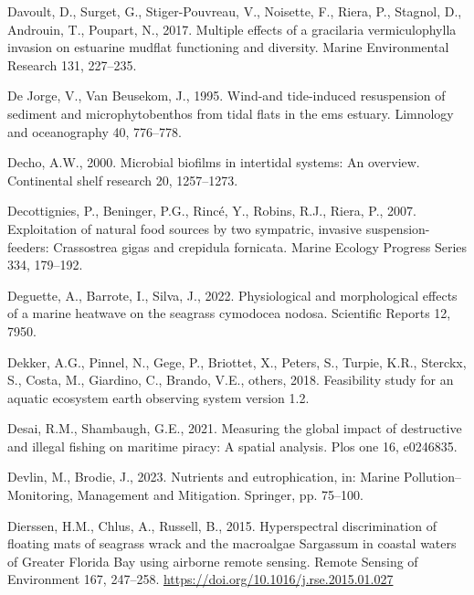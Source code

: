 \documentclass[
  letterpaper,
  11pt,
  english,
  singlespacing,
  headsepline]{MastersDoctoralThesis}
\newlength{\cslhangindent}
\newenvironment{CSLReferences}[2] %
 {\begin{list}{}{%
  \setlength{\itemindent}{0pt}
  \setlength{\leftmargin}{0pt}
  \setlength{\parsep}{0pt}
  \ifodd #1
   \setlength{\leftmargin}{\cslhangindent}
   \setlength{\itemindent}{-1\cslhangindent}
  \fi
  \setlength{\itemsep}{#2\baselineskip}}}
 {\end{list}}
\begin{document}
\begin{CSLReferences}{1}{0}
Davoult, D., Surget, G., Stiger-Pouvreau, V., Noisette, F., Riera, P.,
Stagnol, D., Androuin, T., Poupart, N., 2017. Multiple effects of a
gracilaria vermiculophylla invasion on estuarine mudflat functioning and
diversity. Marine Environmental Research 131, 227--235.

De Jorge, V., Van Beusekom, J., 1995. Wind-and tide-induced resuspension
of sediment and microphytobenthos from tidal flats in the ems estuary.
Limnology and oceanography 40, 776--778.

Decho, A.W., 2000. Microbial biofilms in intertidal systems: An
overview. Continental shelf research 20, 1257--1273.

Decottignies, P., Beninger, P.G., Rincé, Y., Robins, R.J., Riera, P.,
2007. Exploitation of natural food sources by two sympatric, invasive
suspension-feeders: Crassostrea gigas and crepidula fornicata. Marine
Ecology Progress Series 334, 179--192.

Deguette, A., Barrote, I., Silva, J., 2022. Physiological and
morphological effects of a marine heatwave on the seagrass cymodocea
nodosa. Scientific Reports 12, 7950.

Dekker, A.G., Pinnel, N., Gege, P., Briottet, X., Peters, S., Turpie,
K.R., Sterckx, S., Costa, M., Giardino, C., Brando, V.E., others, 2018.
Feasibility study for an aquatic ecosystem earth observing system
version 1.2.

Desai, R.M., Shambaugh, G.E., 2021. Measuring the global impact of
destructive and illegal fishing on maritime piracy: A spatial analysis.
Plos one 16, e0246835.

Devlin, M., Brodie, J., 2023. Nutrients and eutrophication, in: Marine
Pollution--Monitoring, Management and Mitigation. Springer, pp. 75--100.

Dierssen, H.M., Chlus, A., Russell, B., 2015. {Hyperspectral
discrimination of floating mats of seagrass wrack and the macroalgae
Sargassum in coastal waters of Greater Florida Bay using airborne remote
sensing}. Remote Sensing of Environment 167, 247--258.
\url{https://doi.org/10.1016/j.rse.2015.01.027}


\end{CSLReferences}
\end{document}
